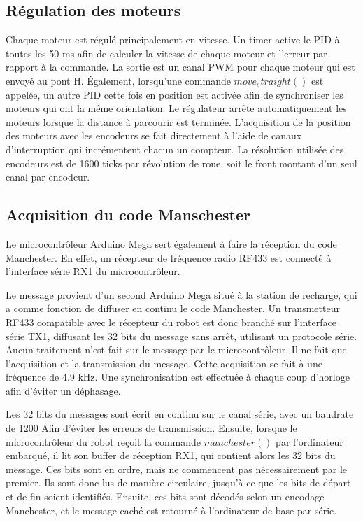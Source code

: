 \subsection{Régulation des moteurs}

Chaque moteur est régulé principalement en vitesse.
Un timer active le PID à toutes les 50 ms afin de calculer la vitesse de chaque moteur et l’erreur par rapport à la commande.
La sortie est un canal PWM pour chaque moteur qui est envoyé au pont H. Également, lorsqu’une commande $move_straight()$ est appelée, un autre PID cette fois en position est activée afin de
synchroniser les moteurs qui ont la même orientation. Le régulateur arrête automatiquement les moteurs lorsque la distance à parcourir est terminée. L'acquisition de la position des moteurs avec
les encodeurs se fait directement à l’aide de canaux d’interruption qui incrémentent chacun un compteur. La résolution utilisée des encodeurs est de 1600 ticks par révolution de roue, soit le front
 montant d’un seul canal par encodeur.


\subsection{Acquisition du code Manschester}

Le microcontrôleur Arduino Mega sert également à faire la réception du code Manchester. En effet, un récepteur de fréquence radio RF433 est connecté à l’interface série RX1 du microcontrôleur.

Le message provient d’un second Arduino Mega situé à la station de recharge, qui a comme fonction de diffuser en continu le code Manchester. Un transmetteur RF433 compatible avec le
récepteur du robot est donc branché sur l’interface série TX1, diffusant les 32 bits du message sans arrêt, utilisant un protocole série. Aucun traitement n’est fait sur le message par le microcontrôleur.
Il ne fait que l’acquisition et la transmission du message. Cette acquisition se fait à une fréquence de 4.9 kHz. Une synchronisation est effectuée à chaque coup d’horloge afin d’éviter un déphasage.

Les 32 bits du messages sont écrit en continu sur le canal série, avec un baudrate de 1200 Afin d’éviter les erreurs de transmission. Ensuite, lorsque le microcontrôleur du robot reçoit la
commande $manchester()$ par l’ordinateur embarqué, il lit son buffer de réception RX1, qui contient alors les 32 bits du message. Ces bits sont en ordre, mais ne commencent pas nécessairement par le premier.
Ils sont donc lus de manière circulaire, jusqu’à ce que les bits de départ et de fin soient identifiés. Ensuite, ces bits sont décodés selon un encodage Manchester, et le message caché est retourné à
l’ordinateur de base par série.

